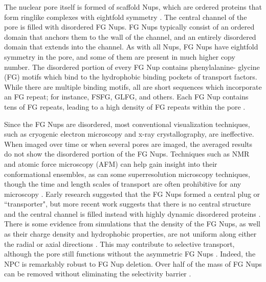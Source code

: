 The nuclear pore itself is formed of scaffold Nups, which are ordered proteins that form ringlike complexes with eightfold symmetry \cite{beck17,strambio-de-castillia10}.  The central channel of the pore is filled with disordered FG Nups.  FG Nups typically consist of an ordered domain that anchors them to the wall of the channel, and an entirely disordered domain that extends into the channel.  As with all Nups, FG Nups have eightfold symmetry in the pore, and some of them are present in much higher copy number. The disordered portion of every FG Nup contains phenylalanine- glycine (FG) motifs which bind to the hydrophobic binding pockets of transport factors.  While there are multiple binding motifs, all are short sequences which incorporate an FG repeat; for instance, FSFG, GLFG, and others.  Each FG Nup contains tens of FG repeats, leading to a high density of FG repeats within the pore \cite{strambio-de-castillia10,terry09}.

Since the FG Nups are disordered, most conventional visualization techniques, such as cryogenic electron microscopy and x-ray crystallography, are ineffective.  When imaged over time or when several pores are imaged, the averaged results do not show the disordered portion of the FG Nups. Techniques such as NMR and atomic force microscopy (AFM) can help gain insight into their conformational ensembles, as can some superresolution microscopy techniques, though the time and length scales of transport are often prohibitive for any microscopy \cite{hough15,sakiyama16,tu11}.  Early research suggested that the FG Nups formed a central plug or ``transporter", but more recent work suggests that there is no central structure and the central channel is filled instead with highly dynamic disordered proteins \cite{moussavi-baygi16,schoch12,sakiyama16}. There is some evidence from simulations that the density of the FG Nups, as well as their charge density and hydrophobic properties, are not uniform along either the radial or axial directions \cite{yamada10,ando14,tagliazucchi13}.  This may contribute to selective transport, although the pore still functions without the asymmetric FG Nups \cite{zeitler04}.  Indeed, the NPC is remarkably robust to FG Nup deletion.  Over half of the mass of FG Nups can be removed without eliminating the selectivity barrier \cite{strawn04, zeitler04,kowalczyk11, jovanovic-talisman09}.

